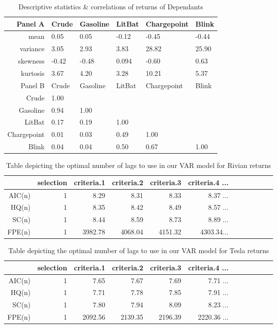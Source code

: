 \documentclass[a4paper,12pt]{article}
\begin{document}
\begin{table}[!h]
\centering
\begin{tabular}{rlllll}
  \hline
Panel A & Crude & Gasoline & LitBat & Chargepoint & Blink \\ 
  \hline
mean &  0.05 &  0.05 & -0.12 & -0.45 & -0.44 \\ 
  variance &  3.05 &  2.93 &  3.83 & 28.82 & 25.90 \\ 
  skewness & -0.42 & -0.48 &  0.094 & -0.60 &  0.63 \\ 
  kurtosis &  3.67 &  4.20 &  3.28 & 10.21 &  5.37 \\ 
   \hline
  \hline
 Panel B & Crude & Gasoline & LitBat & Chargepoint & Blink \\ 
  \hline
Crude & 1.00 &  &  &  &  \\ 
  Gasoline & 0.94 & 1.00 &  &  &  \\ 
  LitBat & 0.17 & 0.19 & 1.00 &  &  \\ 
  Chargepoint & 0.01 & 0.03 & 0.49 & 1.00 &  \\ 
  Blink & 0.04 & 0.04 & 0.50 & 0.67 & 1.00 \\ 
   \hline
\end{tabular}
\caption{Descriptive statistics \& correlations of returns of Dependants}
\label{tab:stats_correlations2}
\end{table}

\begin{table}[!h]
\centering
\begin{tabular}{rrrrrrrrrrrr}
  \hline
 & selection & criteria.1 & criteria.2 & criteria.3 & criteria.4 ... \\
  \hline
AIC(n) &   1 & 8.29 & 8.31 & 8.33 & 8.37 ... \\
  HQ(n) &   1 & 8.35 & 8.42 & 8.49 & 8.57 ... \\
  SC(n) &   1 & 8.44 & 8.59 & 8.73 & 8.89 ... \\
  FPE(n) &   1 & 3982.78 & 4068.04 & 4151.32 & 4303.34... \\
   \hline
\end{tabular}
\caption{Table depicting the optimal number of lags to use in our VAR model for Rivian returns}
\end{table}

\begin{table}[!h]
\centering
\begin{tabular}{rrrrrrrrrrrr}
  \hline
 & selection & criteria.1 & criteria.2 & criteria.3 & criteria.4 ... \\ 
  \hline
AIC(n) &   1 & 7.65 & 7.67 & 7.69 & 7.71 ... \\ 
  HQ(n) &   1 & 7.71 & 7.78 & 7.85 & 7.91 ... \\ 
  SC(n) &   1 & 7.80 & 7.94 & 8.09 & 8.23 ... \\ 
  FPE(n) &   1 & 2092.56 & 2139.35 & 2196.39 & 2220.36 ... \\ 
   \hline
\end{tabular}
\caption{Table depicting the optimal number of lags to use in our VAR model for Tesla returns}
\end{table}
\end{document}
